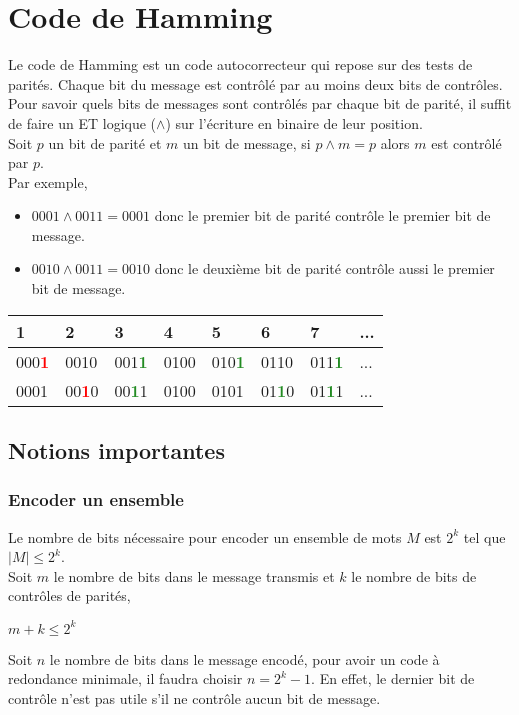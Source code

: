 \documentclass[a4paper, 12pt]{article}
\begin{document}
	\section{Code de Hamming}
	Le code de Hamming est un code autocorrecteur qui repose sur des tests de parités. Chaque bit du message est contrôlé par au moins deux bits de contrôles.
	Pour savoir quels bits de messages sont contrôlés par chaque bit de parité, il suffit de faire un ET logique ($\wedge$) sur l’écriture en binaire de leur position.\\
	Soit $p$ un bit de parité et $m$ un bit de message, si $p \wedge m = p$ alors $m$ est contrôlé par $p$.\\ Par exemple,
	\begin{itemize}
		\item $0001 \wedge 0011 = 0001$ donc le premier bit de parité contrôle le premier bit de message.
		\item $0010 \wedge 0011 = 0010$ donc le deuxième bit de parité contrôle aussi le premier bit de message.
	\end{itemize}
	\begin{center}
		\begin{tabular}{|m{1.5cm}<{\centering}|m{1.5cm}<{\centering}|m{1.5cm}<{\centering}|m{1.5cm}<{\centering}|m{1.5cm}<{\centering}|m{1.5cm}<{\centering}|m{1.5cm}<{\centering}|m{1.5cm}<{\centering}|}
			\hline
			1 & 2 & 3 & 4 & 5 & 6 & 7 & ... \\
			\hline
			000\textbf{\textcolor{red}{1}} & 0010 & 001\textbf{\textcolor{ForestGreen}{1}} & 0100 & 010\textbf{\textcolor{ForestGreen}{1}} & 0110 & 011\textbf{\textcolor{ForestGreen}{1}} & ... \\
			\hline
			0001 & 00\textbf{\textcolor{red}{1}}0 & 00\textbf{\textcolor{ForestGreen}{1}}1 & 0100 & 0101 & 01\textbf{\textcolor{ForestGreen}{1}}0 & 01\textbf{\textcolor{ForestGreen}{1}}1 & ... \\
			\hline
		\end{tabular}
	\end{center}

    \subsection{Notions importantes}
    \subsubsection{Encoder un ensemble}
    Le nombre de bits nécessaire pour encoder un ensemble de mots $M$ est $2^k$ tel que $|M| \leq 2^k$.\\
    Soit $m$ le nombre de bits dans le message transmis et $k$ le nombre de bits de contrôles de parités,
	\begin{center}
		$m + k \leq  2^k $
	\end{center}
	Soit $n$ le nombre de bits dans le message encodé, pour avoir un code à redondance minimale, il faudra choisir $n = 2^k - 1$. En effet, le dernier bit de contrôle n'est pas utile s'il ne contrôle aucun bit de message.
\end{document}
